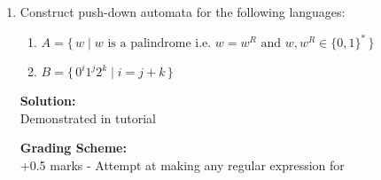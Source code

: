 \documentclass[11pt, article, oneside]{memoir}
\newcommand{\set}[1]{\{\, #1\, \}}
\begin{document}
\begin{enumerate}
    \item
        Construct push-down automata for the following languages:
        \begin{enumerate}
            \item
                \(A = \set{w \mid w \text{ is a palindrome i.e. } w = w^R \text{ and } w, w^R \in \{0, 1\}^*}\) 
            \item
                \(B = \set{ {0^i}{1^j}{2^k} \mid i = j + k}\)
        \end{enumerate}

        \textbf{Solution:}
        \\Demonstrated in tutorial

        \textbf{Grading Scheme:}
        \\+0.5 marks - Attempt at making any regular expression for
        
\end{enumerate}
\end{document}
